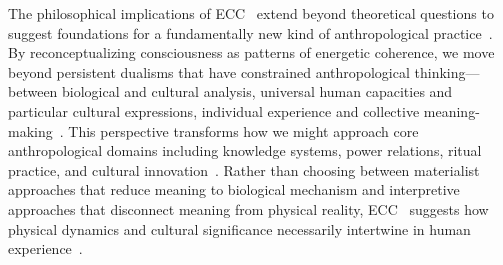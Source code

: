 The philosophical implications of ECC~ extend beyond theoretical questions to suggest foundations for a fundamentally new kind of anthropological practice~\cite{fischer2018anthropology, rabinow2008marking}. By reconceptualizing consciousness as patterns of energetic coherence, we move beyond persistent dualisms that have constrained anthropological thinking—between biological and cultural analysis, universal human capacities and particular cultural expressions, individual experience and collective meaning-making~\cite{strathern2004partial, csordas1990embodiment}. This perspective transforms how we might approach core anthropological domains including knowledge systems, power relations, ritual practice, and cultural innovation~\cite{ingold2013making, wolf1999envisioning, kapferer2004ritual}. Rather than choosing between materialist approaches that reduce meaning to biological mechanism and interpretive approaches that disconnect meaning from physical reality, ECC~ suggests how physical dynamics and cultural significance necessarily intertwine in human experience~\cite{latour2005reassembling, viveiros2014cannibal}.

